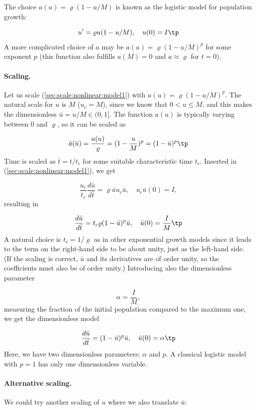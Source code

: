 \documentclass[graybox,envcountchap,sectrefs,final]{svmonodo}
\begin{document}
The choice $a(u)=\varrho(1-u/M)$ is known as the logistic model for
population growth:

\begin{equation}
u' = \varrho u(1-u/M),\quad u(0)=I\tp
\label{sec:scale:nonlinear:model2}
\end{equation}
A more complicated choice of $a$ may be $a(u)=\varrho(1-u/M)^p$ for
some exponent $p$ (this function also fulfills $a(M)=0$ and $a\approx\varrho$
for $t=0$).


\paragraph{Scaling.}
Let us scale (\ref{sec:scale:nonlinear:model1}) with
$a(u)=\varrho (1-u/M)^p$.
The natural scale for $u$ is $M$ ($u_c=M$), since we know that
$0 < u\leq M$, and this makes the dimensionless $\bar u = u/M \in (0,1]$.
The function $a(u)$ is
typically varying between 0 and $\varrho$, so it can be scaled as

\[ \bar a(\bar u) = \frac{a(u)}{\varrho} = (1 - \frac{u}{M})^p =
(1 - \bar u)^p\tp\]
Time is scaled as $\bar t = t/t_c$ for some suitable characteristic time $t_c$.
Inserted in (\ref{sec:scale:nonlinear:model1}), we get

\[ \frac{u_c}{t_c}\frac{d\bar u}{d\bar t} = \varrho\bar a u_c\bar u,\quad u_c\bar u(0)=I,\]
resulting in

\[ \frac{d\bar u}{d\bar t} = t_c \varrho (1 - \bar u)^p \bar u,\quad
\bar u(0) =\frac{I}{M}\tp\]
A natural choice is $t_c =1/\varrho$ as in other exponential growth models
since it leads to the term on the right-hand side to be about unity,
just as the left-hand side. (If the scaling is correct, $\bar u$ and its
derivatives are of order unity, so the coefficients must also be of order
unity.) Introducing also the dimensionless parameter

\[ \alpha = \frac{I}{M},\]
measuring the fraction of the initial population compared to the maximum
one, we get the dimensionless model

\begin{equation}
\frac{d\bar u}{d\bar t} = (1 - \bar u)^p \bar u,\quad
\bar u(0) =\alpha\tp
\label{sec:scale:nonlinear:model1:scaled}
\end{equation}
Here, we have two dimensionless parameters: $\alpha$ and $p$. A classical
logistic model with $p=1$ has only one dimensionless variable.

\paragraph{Alternative scaling.}
We could try another scaling of $u$ where we also translate $\bar u$:
\end{document}
